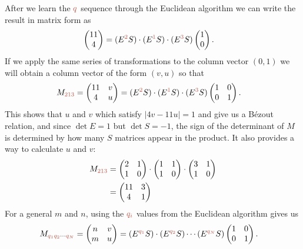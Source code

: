After we learn the $\jq$ sequence through the Euclidean algorithm we can write the result in matrix form as 
\begin{align*}
	\begin{pmatrix} 11 \\ 4 \end{pmatrix}  &= 
	(E^{\jqn{2}} S )\cdot( E^{\jqn{1}} S ) \cdot (E^{\jqn{3}} S)  \begin{pmatrix} 1 \\ 0 \end{pmatrix}.
\end{align*}
If we apply the same series of transformations to the column vector $(0,1)$ we will obtain a column vector of the form $(v,u)$  so that
\begin{align}
		M_{\jqn{2}\jqn{1}\jqn{3}}= \begin{pmatrix} 11 & v \\ 4 & u \end{pmatrix}   &= 
	(E^{\jqn{2}} S )\cdot( E^{\jqn{1}} S ) \cdot (E^{\jqn{3}} S) 
	 \begin{pmatrix} 1&0  \\ 0&1 \end{pmatrix} 
	 \label{eq:M213}.
\end{align}
This shows that  $u$ and $v$ which satisfy $|4 v-11 u|=1$ and give us a B\'ezout relation, and since $\det E=1$ but $\det S=-1$, the sign of the determinant of $M$ is determined by how many $S$ matrices appear in the product. It also provides a way to calculate $u$ and $v$:
\begin{align*}
	M_{\jqn{2}\jqn{1}\jqn{3}}&=
	 \begin{pmatrix} 2 & 1 \\ 1 & 0 \end{pmatrix}\cdot
 \begin{pmatrix} 1 & 1 \\ 1 & 0 \end{pmatrix}\cdot
	  \begin{pmatrix} 3 & 1 \\ 1 & 0 \end{pmatrix}
	 	 \\
	 &= \begin{pmatrix} 11 & 3 \\ 4 & 1 \end{pmatrix}
\end{align*}
For a general $m$ and $n$, using the $\jqi$ values from the Euclidean algorithm gives us 
\begin{align}
	M_{\jqn{q_1}\jqn{q_2}\cdots\jqn{q_N}}=\begin{pmatrix} n & v \\ m & u \end{pmatrix}   &= 
	(E^{\jqn{q_1}} S )\cdot( E^{\jqn{q_2}} S ) \cdots  (E^{\jqn{q_N}} S)  \begin{pmatrix} 1&0  \\ 0&1 \end{pmatrix}.
	\label{eq:EuclideanMatrixq}
\end{align}
